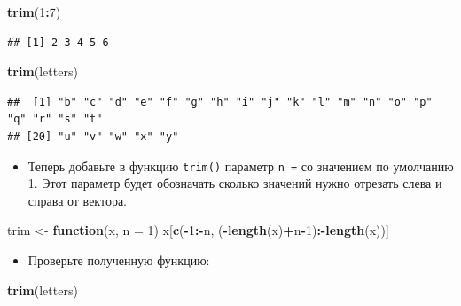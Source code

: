 \documentclass[]{book}
\newenvironment{Shaded}{\begin{snugshade}}{\end{snugshade}}
\newcommand{\KeywordTok}[1]{\textcolor[rgb]{0.13,0.29,0.53}{\textbf{#1}}}
\newcommand{\DataTypeTok}[1]{\textcolor[rgb]{0.13,0.29,0.53}{#1}}
\newcommand{\DecValTok}[1]{\textcolor[rgb]{0.00,0.00,0.81}{#1}}
\newcommand{\StringTok}[1]{\textcolor[rgb]{0.31,0.60,0.02}{#1}}
\newcommand{\ControlFlowTok}[1]{\textcolor[rgb]{0.13,0.29,0.53}{\textbf{#1}}}
\newcommand{\OperatorTok}[1]{\textcolor[rgb]{0.81,0.36,0.00}{\textbf{#1}}}
\newcommand{\NormalTok}[1]{#1}
\providecommand{\tightlist}{%
  \setlength{\itemsep}{0pt}\setlength{\parskip}{0pt}}
\begin{document}
\begin{Shaded}
\begin{Highlighting}[]
\KeywordTok{trim}\NormalTok{(}\DecValTok{1}\OperatorTok{:}\DecValTok{7}\NormalTok{)}
\end{Highlighting}
\end{Shaded}

\begin{verbatim}
## [1] 2 3 4 5 6
\end{verbatim}

\begin{Shaded}
\begin{Highlighting}[]
\KeywordTok{trim}\NormalTok{(letters)}
\end{Highlighting}
\end{Shaded}

\begin{verbatim}
##  [1] "b" "c" "d" "e" "f" "g" "h" "i" "j" "k" "l" "m" "n" "o" "p" "q" "r" "s" "t"
## [20] "u" "v" "w" "x" "y"
\end{verbatim}

\begin{itemize}
\tightlist
\item
  Теперь добавьте в функцию \texttt{trim()} параметр \texttt{n\ =} со
  значением по умолчанию 1. Этот параметр будет обозначать сколько
  значений нужно отрезать слева и справа от вектора.
\end{itemize}

\begin{Shaded}
\begin{Highlighting}[]
\NormalTok{trim <-}\StringTok{ }\ControlFlowTok{function}\NormalTok{(x, }\DataTypeTok{n =} \DecValTok{1}\NormalTok{) x[}\KeywordTok{c}\NormalTok{(}\OperatorTok{-}\DecValTok{1}\OperatorTok{:-}\NormalTok{n, (}\OperatorTok{-}\KeywordTok{length}\NormalTok{(x)}\OperatorTok{+}\NormalTok{n}\OperatorTok{-}\DecValTok{1}\NormalTok{)}\OperatorTok{:-}\KeywordTok{length}\NormalTok{(x))]}
\end{Highlighting}
\end{Shaded}

\begin{itemize}
\tightlist
\item
  Проверьте полученную функцию:
\end{itemize}

\begin{Shaded}
\begin{Highlighting}[]
\KeywordTok{trim}\NormalTok{(letters)}
\end{Highlighting}
\end{Shaded}
\end{document}
